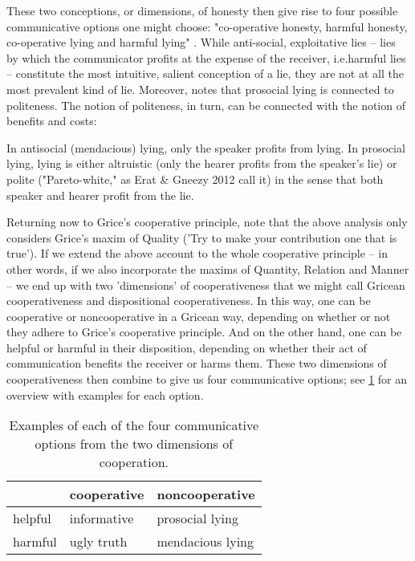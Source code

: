 These two conceptions, or dimensions, of honesty then give rise to four possible communicative options one might choose: "co-operative honesty, harmful honesty, co-operative lying and harmful lying" \citep[p.~45]{Dor17}.
While anti-social, exploitative lies -- lies by which the communicator profits at the expense of the receiver, i.e.\@ harmful lies -- constitute the most intuitive, salient conception of a lie, they are not at all the most prevalent kind of lie. Moreover, \citet{Meibauer18} notes that prosocial lying is connected to politeness. The notion of politeness, in turn, can be connected with the notion of benefits and costs:
\begin{quoting}
    In antisocial (mendacious) lying, only the speaker profits from lying. In prosocial lying, lying is either altruistic (only the hearer profits from the speaker's lie) or polite ("Pareto-white," as Erat \& Gneezy 2012 call it) in the sense that both speaker and hearer profit from the lie.
    \hfill \citep[p.~371]{Meibauer18}
\end{quoting}

Returning now to Grice's cooperative principle, note that the above analysis only considers Grice's maxim of Quality ('Try to make your contribution one that is true'). If we extend the above account to the whole cooperative principle -- in other words, if we also incorporate the maxims of Quantity, Relation and Manner -- we end up with two 'dimensions' of cooperativeness that we might call Gricean cooperativeness and dispositional cooperativeness. In this way, one can be cooperative or noncooperative in a Gricean way, depending on whether or not they adhere to Grice's cooperative principle. And on the other hand, one can be helpful or harmful in their disposition, depending on whether their act of communication benefits the receiver or harms them.
These two dimensions of cooperativeness then combine to give us four communicative options; see \cref{tab:dimensions-of-cooperation} for an overview with examples for each option.

\begin{table}[ht]
  \centering
\begin{tabular}{|l|l|l|}
  \hline
    & cooperative & noncooperative \\ \hline
  helpful & informative & prosocial lying \\ \hline
  harmful & ugly truth & mendacious lying \\ \hline
\end{tabular}
\caption{Examples of each of the four communicative options from the two dimensions of cooperation.}
\label{tab:dimensions-of-cooperation}
\end{table}

